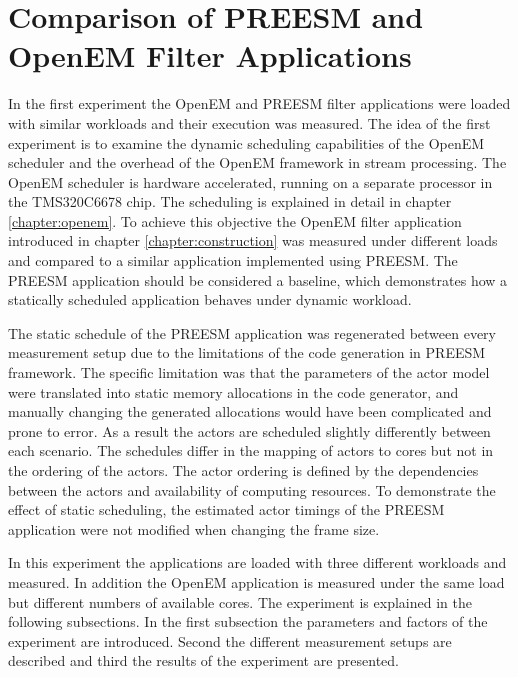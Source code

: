 \section{Comparison of PREESM and OpenEM Filter Applications}
\label{sec:firstexperiment}
In the first experiment the OpenEM and PREESM filter applications were loaded
with similar workloads and their execution was measured. The idea of the first
experiment is to examine the dynamic scheduling capabilities of the OpenEM
scheduler and the overhead of the OpenEM framework in stream processing. The
OpenEM scheduler is hardware accelerated, running on a separate processor in the
TMS320C6678 chip. The scheduling is explained in detail in chapter
\ref{chapter:openem}. To achieve this objective the OpenEM filter application
introduced in chapter \ref{chapter:construction} was measured under different
loads and compared to a similar application implemented using PREESM. The
PREESM application should be considered a baseline, which demonstrates how a
statically scheduled application behaves under dynamic workload.

The static schedule of the PREESM application was regenerated between every
measurement setup due to the limitations of the code generation in PREESM
framework. The specific limitation was that the parameters of the actor model
were translated into static memory allocations in the code generator, and
manually changing the generated allocations would have been complicated and
prone to error. As a result the actors are scheduled slightly differently
between each scenario. The schedules differ in the mapping of actors to cores
but not in the ordering of the actors. The actor ordering is defined by the
dependencies between the actors and availability of computing resources. To
demonstrate the effect of static scheduling, the estimated actor timings of the
PREESM application were not modified when changing the frame size. 

In this experiment the applications are loaded with three different workloads
and measured. In addition the OpenEM application is measured under the same load
but different numbers of available cores. The experiment is explained in the
following subsections. In the first subsection the parameters and factors of the
experiment are introduced. Second the different measurement setups are described
and third the results of the experiment are presented.

